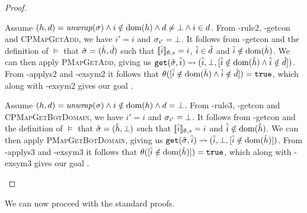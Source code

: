 \begin{proof}

\begin{hypvlist}
 Assume $(h,d)=\operatorname{\mathit{unwrap}}(\sigma) \land i\notin\operatorname{dom}(h) \land d\neq\bot \land i\in d$.
 From \hyp{rule2}, \hyp{getcon} and \textsc{CPMapGetAdd}, we have $i'=i$ and $\sigma_{i'}=\bot$.
 It follows from \hyp{getcon} and the definition of $\models$ that $\hat{\sigma}=(\hat{h}, \hat{d})$ such that $\llbracket\hat{i}\rrbracket_{\theta,s}=i$, $\hat{i}\in \hat{d}$ and $\hat{i}\notin \operatorname{dom}(\hat{h})$.
 We can then apply \textsc{PMapGetAdd}, giving us $\texttt{get}(\hat{\sigma},\hat{i})\rightsquigarrow(\hat{i},\bot,[\hat{i}\notin \operatorname{dom}(\hat{h}) \land \hat{i}\notin \hat{d}])$.
 From \hyp{applys2} and \hyp{exsym2} it follows that $\theta([\hat{i}\notin \operatorname{dom}(\hat{h}) \land \hat{i}\notin \hat{d}])=\texttt{true}$, which along with \hyp{exsym2} gives our goal .
\end{hypvlist}


\begin{hypvlist}
 Assume $(h,d)=\operatorname{\mathit{unwrap}}(\sigma) \land i\notin\operatorname{dom}(h) \land d=\bot$.
 From \hyp{rule3}, \hyp{getcon} and \textsc{CPMapGetBotDomain}, we have $i'=i$ and $\sigma_{i'}=\bot$.
 It follows from \hyp{getcon} and the definition of $\models$ that $\hat{\sigma}=(\hat{h}, \bot)$ such that $\llbracket\hat{i}\rrbracket_{\theta,s}=i$ and $\hat{i}\notin \operatorname{dom}(\hat{h})$.
 We can then apply \textsc{PMapGetBotDomain}, giving us $\texttt{get}(\hat{\sigma},\hat{i})\rightsquigarrow(\hat{i},\bot,[\hat{i}\notin \operatorname{dom}(\hat{h})])$.
 From \hyp{applys3} and \hyp{exsym3} it follows that $\theta([\hat{i}\notin \operatorname{dom}(\hat{h})])=\texttt{true}$, which along with \hyp{exsym3} gives our goal .
\end{hypvlist}

\end{proof}

We can now proceed with the standard proofs.


